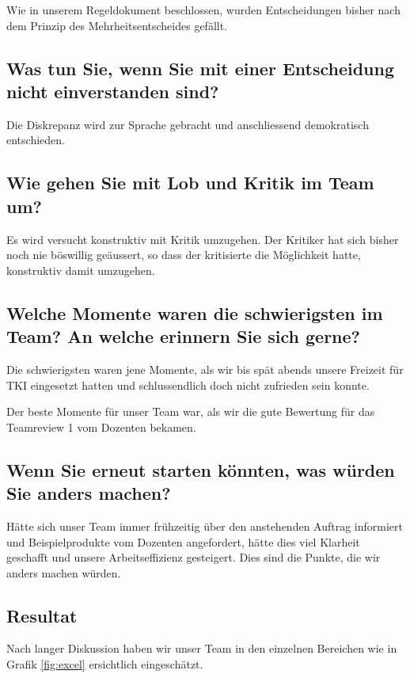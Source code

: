 Wie in unserem Regeldokument beschlossen, wurden Entscheidungen bisher nach dem Prinzip des Mehrheitsentscheides gefällt.

\subsection*{Was tun Sie, wenn Sie mit einer Entscheidung nicht einverstanden sind?}

Die Diskrepanz wird zur Sprache gebracht und anschliessend demokratisch entschieden.

\subsection*{Wie gehen Sie mit Lob und Kritik im Team um?}

Es wird versucht konstruktiv mit Kritik umzugehen. Der Kritiker hat sich bisher noch nie böswillig geäussert, so dass der kritisierte die Möglichkeit hatte, konstruktiv damit umzugehen. 

\subsection*{Welche Momente waren die schwierigsten im Team? An welche erinnern Sie sich
gerne?}

Die schwierigsten waren jene Momente, als wir bis spät abends unsere Freizeit für TKI eingesetzt hatten und schlussendlich doch nicht zufrieden sein konnte. 

Der beste Momente für unser Team war, als wir die gute Bewertung für das Teamreview 1 vom Dozenten bekamen.  

\subsection*{Wenn Sie erneut starten könnten, was würden Sie anders machen?}

Hätte sich unser Team immer frühzeitig über den anstehenden Auftrag informiert und Beispielprodukte vom Dozenten angefordert, hätte dies viel Klarheit geschafft und unsere Arbeitseffizienz gesteigert. Dies sind die Punkte, die wir anders machen würden. 

\subsection*{Resultat}

Nach langer Diskussion haben wir unser Team in den einzelnen Bereichen wie in Grafik \ref{fig:excel} ersichtlich eingeschätzt.

